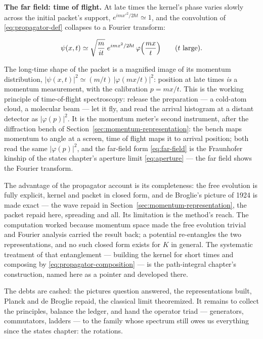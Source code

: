 \medskip\noindent\textbf{The far field: time of flight.} At late times the kernel's phase varies slowly across the initial packet's support, $e^{imx'^2/2\hbar t} \simeq 1$, and the convolution of \eqref{eq:propagator-def} collapses to a Fourier transform:
\begin{linenomath}
    \begin{equation}
        \psi(x, t) \simeq \sqrt{\frac{m}{it}}\;e^{imx^2/2\hbar t}\,\varphi\Bigl(\frac{mx}{t}\Bigr)
        \qquad (t\ \text{large}) .
        \label{eq:far-field}
    \end{equation}
\end{linenomath}
The long-time shape of the packet is a magnified image of its momentum distribution, $|\psi(x, t)|^2 \simeq (m/t)\,|\varphi(mx/t)|^2$: position at late times \emph{is} a momentum measurement, with the calibration $p = mx/t$. This is the working principle of time-of-flight spectroscopy: release the preparation --- a cold-atom cloud, a molecular beam --- let it fly, and read the arrival histogram at a distant detector as $|\varphi(p)|^2$. It is the momentum meter's second instrument, after the diffraction bench of Section~\ref{sec:momentum-representation}: the bench maps momentum to angle at a screen, time of flight maps it to arrival position; both read the same $|\varphi(p)|^2$, and the far-field form \eqref{eq:far-field} is the Fraunhofer kinship of the states chapter's aperture limit \eqref{eq:aperture} --- the far field shows the Fourier transform.

The advantage of the propagator account is its completeness: the free evolution is fully explicit, kernel and packet in closed form, and de Broglie's picture of 1924 is made exact --- the wave repaid in Section~\ref{sec:momentum-representation}, the packet repaid here, spreading and all. Its limitation is the method's reach. The computation worked because momentum space made the free evolution trivial and Fourier analysis carried the result back; a potential re-entangles the two representations, and no such closed form exists for $K$ in general. The systematic treatment of that entanglement --- building the kernel for short times and composing by \eqref{eq:propagator-composition} --- is the path-integral chapter's construction, named here as a pointer and developed there.

The debts are cashed: the pictures question answered, the representations built, Planck and de Broglie repaid, the classical limit theoremized. It remains to collect the principles, balance the ledger, and hand the operator triad --- generators, commutators, ladders --- to the family whose spectrum still owes us everything since the states chapter: the rotations.

